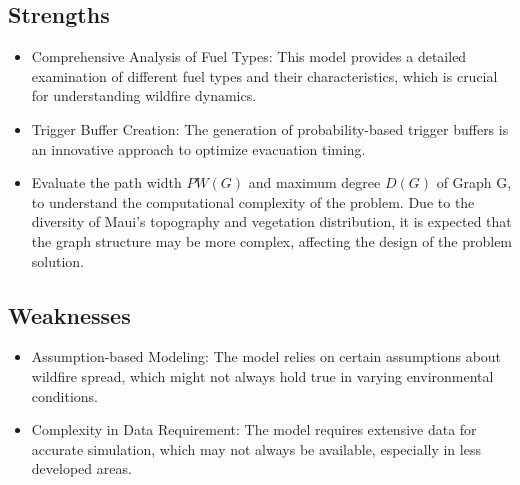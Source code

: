 \documentclass[12pt]{article}  %
\begin{document}
 \subsection{Strengths}
 \begin{itemize}
 	\setlength{\parsep}{0ex} 
 	\setlength{\topsep}{2ex} 
 	\setlength{\itemsep}{1ex} 
 	\item Comprehensive Analysis of Fuel Types: This model provides a detailed examination of different fuel types and their characteristics, which is crucial for understanding wildfire dynamics.
 	
 	\item Trigger Buffer Creation: The generation of probability-based trigger buffers is an innovative approach to optimize evacuation timing.
 	
 	\item Evaluate the path width $PW(G)$ and maximum degree $D(G)$ of Graph G, to understand the computational complexity of the problem. Due to the diversity of Maui's topography and vegetation distribution, it is expected that the graph structure may be more complex, affecting the design of the problem solution.
 	
 \end{itemize}
 
 \subsection{Weaknesses}
  \begin{itemize}
	\setlength{\parsep}{0ex} 
	\setlength{\topsep}{2ex} 
	\setlength{\itemsep}{1ex} 
 	\item Assumption-based Modeling: The model relies on certain assumptions about wildfire spread, which might not always hold true in varying environmental conditions.
 	
 	\item Complexity in Data Requirement: The model requires extensive data for accurate simulation, which may not always be available, especially in less developed areas.
 \end{itemize}
 
\end{document}
